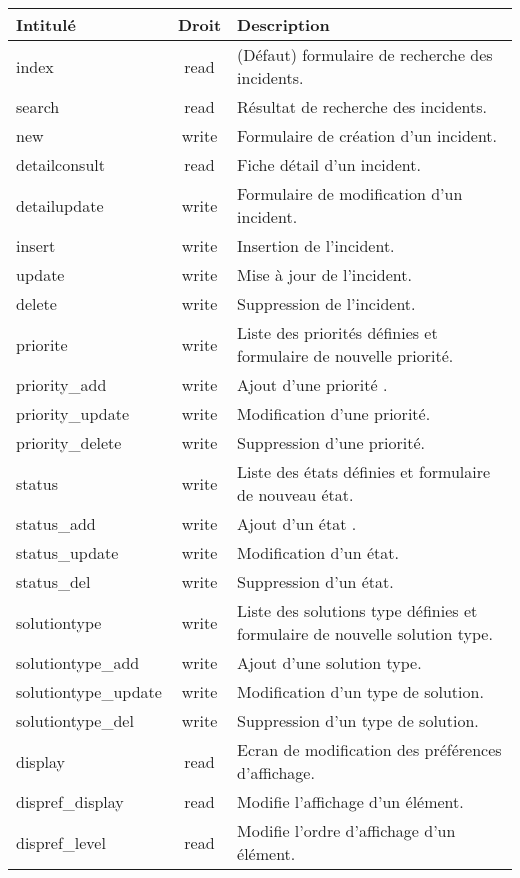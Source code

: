 \begin{tabular}{|l|c|p{9.5cm}|}
 \hline
 \textbf{Intitulé} & \textbf{Droit} & \textbf{Description} \\
 \hline
 \hline
  index & read & (Défaut) formulaire de recherche des incidents. \\ 
 \hline
  search & read & Résultat de recherche des incidents. \\
 \hline
  new & write & Formulaire de création d'un incident. \\
 \hline
  detailconsult & read & Fiche détail d'un incident. \\
 \hline
  detailupdate & write & Formulaire de modification d'un incident. \\
 \hline
  insert & write & Insertion de l'incident. \\
 \hline
  update & write & Mise à jour de l'incident. \\
 \hline
  delete & write & Suppression de l'incident. \\
 \hline
  priorite & write & Liste des priorités définies et formulaire de nouvelle priorité. \\
 \hline
  priority\_add & write & Ajout d'une priorité . \\
 \hline
  priority\_update & write & Modification d'une priorité. \\
 \hline
  priority\_delete & write & Suppression d'une priorité. \\
 \hline
  status & write & Liste des états définies et formulaire de nouveau état. \\
 \hline
  status\_add & write & Ajout d'un état . \\
 \hline
  status\_update & write & Modification d'un état. \\
 \hline
  status\_del & write & Suppression d'un état. \\
 \hline
  solutiontype & write & Liste des solutions type définies et formulaire de nouvelle solution type. \\
 \hline
  solutiontype\_add & write & Ajout d'une solution type. \\
 \hline
  solutiontype\_update & write & Modification d'un type de solution. \\
 \hline
  solutiontype\_del & write & Suppression d'un type de solution. \\
 \hline
  display & read & Ecran de modification des préférences d'affichage. \\
 \hline
  dispref\_display & read & Modifie l'affichage d'un élément. \\
 \hline
  dispref\_level & read & Modifie l'ordre d'affichage d'un élément. \\
 
 \hline
\end{tabular}
